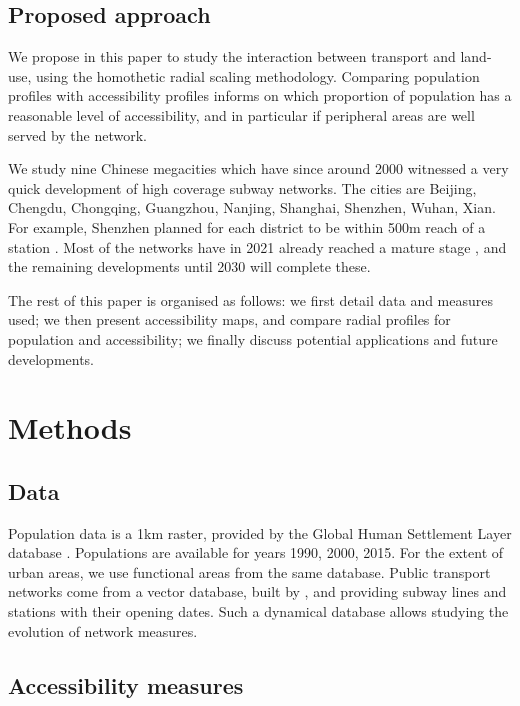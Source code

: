 \documentclass{article}
\begin{document}
\subsection{Proposed approach}

We propose in this paper to study the interaction between transport and land-use, using the homothetic radial scaling methodology. Comparing population profiles with accessibility profiles informs on which proportion of population has a reasonable level of accessibility, and in particular if peripheral areas are well served by the network.

We study nine Chinese megacities which have since around 2000 witnessed a very quick development of high coverage subway networks. The cities are Beijing, Chengdu, Chongqing, Guangzhou, Nanjing, Shanghai, Shenzhen, Wuhan, Xian. For example, Shenzhen planned for each district to be within 500m reach of a station \cite{ng2011strategic}. Most of the networks have in 2021 already reached a mature stage \cite{raimbault2018evolving}, and the remaining developments until 2030 will complete these. 

The rest of this paper is organised as follows: we first detail data and measures used; we then present accessibility maps, and compare radial profiles for population and accessibility; we finally discuss potential applications and future developments.



\section{Methods}

\subsection{Data}

Population data is a 1km raster, provided by the Global Human Settlement Layer database \cite{florczyk2019ghsl}. Populations are available for years 1990, 2000, 2015. For the extent of urban areas, we use functional areas from the same database. Public transport networks come from a vector database, built by \cite{raimbault2018evolving}, and providing subway lines and stations with their opening dates. Such a dynamical database allows studying the evolution of network measures.


\subsection{Accessibility measures}
\end{document}
